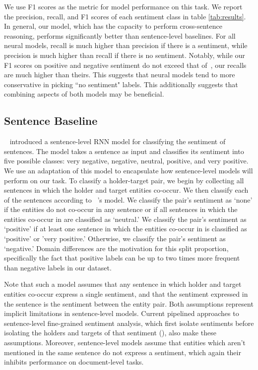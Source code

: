 \documentclass[11pt,a4paper]{article}
\begin{document}
We use F1 scores as the metric for model performance on this task.
We report the precision, recall, and F1 scores of each sentiment class in table \ref{tab:results}.
In general, our model, which has the capacity to perform cross-sentence reasoning, performs significantly better than sentence-level baselines.
For all neural models, recall is much higher than precision if there is a sentiment, while precision is much higher than recall if there is no sentiment. Notably, while our F1 scores on positive and negative sentiment do not exceed that of~, our recalls are much higher than theirs. This suggests that neural models tend to more conservative in picking ``no sentiment" labels. This additionally suggests that combining aspects of both models may be beneficial.

\subsection{Sentence Baseline}
~ introduced a sentence-level RNN model for classifying the sentiment of sentences.
The model takes a sentence as input and classifies its sentiment into five possible classes: very negative, negative, neutral, positive, and very positive.
We use an adaptation of this model to encapsulate how sentence-level models will perform on our task.
To classify a holder-target pair, we begin by collecting all sentences in which the holder and target entities co-occur.
We then classify each of the sentences according to ~'s model.
We classify the pair's sentiment as `none' if the entities do not co-occur in any sentence or if all sentences in which the entities co-occur in are classified as `neutral.'
We classify the pair's sentiment as `positive' if at least one sentence in which the entities co-occur in is classified as `positive' or 'very positive.'
Otherwise, we classify the pair's sentiment as `negative.' %
Domain differences are the motivation for this split proportion, specifically the fact that positive labels can be up to two times more frequent than negative labels in our dataset.
\par Note that such a model assumes that any sentence in which holder and target entities co-occur express a single sentiment, and that the sentiment expressed in the sentence is the sentiment between the entity pair.
Both assumptions represent implicit limitations in sentence-level models.
Current pipelined approaches to sentence-level fine-grained sentiment analysis, which first isolate sentiments before isolating the holders and targets of that sentiment (), also make these assumptions.
Moreover, sentence-level models assume that entities which aren't mentioned in the same sentence do not express a sentiment, which again their inhibits performance on document-level tasks.
\end{document}
